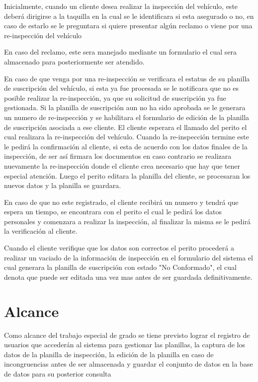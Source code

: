 \newpage
\setlength{\parskip}{5mm}
Inicialmente, cuando un cliente desea realizar la inspección del vehículo, este deberá dirigirse a la taquilla en la cual se le identificara si esta asegurado o no, en caso de estarlo se le preguntara si quiere presentar algún reclamo o viene por una re-inspección del vehículo

En caso del reclamo, este sera manejado mediante un formulario el cual sera almacenado para posteriormente ser atendido.

En caso de que venga por una re-inspección se verificara el estatus de su planilla de suscripción del vehículo, si esta ya fue procesada se le notificara que no es posible realizar la re-inspección, ya que su solicitud de suscripción ya fue gestionada. Si la planilla de suscripción aun no ha sido aprobada se le generara un numero de re-inspección y se habilitara el formulario de edición de la planilla de suscripción asociada a ese cliente. El cliente esperara el llamado del perito el cual realizara la re-inspección del vehículo. Cuando la re-inspección termine este le pedirá la confirmación al cliente, si esta de acuerdo con los datos finales de la inspección, de ser así firmara los documentos en caso contrario se realizara nuevamente la re-inspección donde el cliente crea necesario que hay que tener especial atención. Luego el perito editara la planilla del cliente, se procesaran los nuevos datos y la planilla se guardara.

En caso de que no este registrado, el cliente recibirá un numero y tendrá que espera un tiempo, se encontrara con el perito el cual le pedirá los datos personales y comenzara a realizar la inspección, al finalizar la misma se le pedirá la verificación al cliente.

Cuando el cliente verifique que los datos son correctos el perito procederá a realizar un vaciado de la información de inspección en el formulario del sistema el cual generara la planilla de suscripción con estado "No Conformado", el cual denota que puede ser editada una vez mas antes de ser guardada definitivamente.
\setlength{\parskip}{0mm}



\section{Alcance}

Como alcance del trabajo especial de grado se tiene previsto lograr el registro de usuarios que accederán al sistema para gestionar las planillas, la captura de los datos de la planilla de inspección, la edición de la planilla en caso de incongruencias antes de ser almacenada y guardar el conjunto de datos en la base de datos para su posterior consulta


